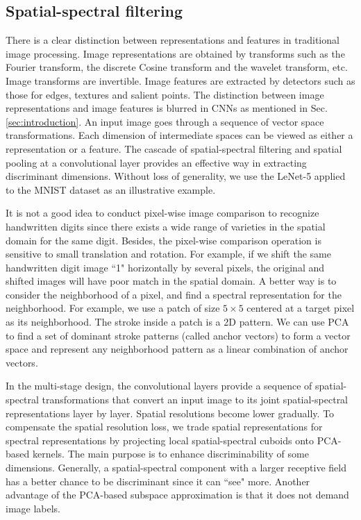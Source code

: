\documentclass[preprint,12pt]{elsarticle}
\begin{document}
\subsection{Spatial-spectral filtering}\label{subsec:filtering}

There is a clear distinction between representations and features in
traditional image processing. Image representations are obtained by
transforms such as the Fourier transform, the discrete Cosine transform
and the wavelet transform, etc. Image transforms are invertible.  Image
features are extracted by detectors such as those for edges, textures
and salient points. The distinction between image representations and
image features is blurred in CNNs as mentioned in Sec.
\ref{sec:introduction}. An input image goes through a sequence of vector
space transformations. Each dimension of intermediate spaces can be
viewed as either a representation or a feature.  The cascade of
spatial-spectral filtering and spatial pooling at a convolutional layer
provides an effective way in extracting discriminant dimensions.
Without loss of generality, we use the LeNet-5 applied to the MNIST
dataset as an illustrative example. 

It is not a good idea to conduct pixel-wise image comparison to
recognize handwritten digits since there exists a wide range of
varieties in the spatial domain for the same digit. Besides, the
pixel-wise comparison operation is sensitive to small translation and
rotation. For example, if we shift the same handwritten digit image ``1"
horizontally by several pixels, the original and shifted images will
have poor match in the spatial domain. A better way is to consider the
neighborhood of a pixel, and find a spectral representation for the
neighborhood.  For example, we use a patch of size $5 \times 5$ centered
at a target pixel as its neighborhood. The stroke inside a patch is a 2D
pattern. We can use PCA to find a set of dominant stroke patterns
(called anchor vectors) to form a vector space and represent any
neighborhood pattern as a linear combination of anchor vectors. 

In the multi-stage design, the convolutional layers provide a sequence
of spatial-spectral transformations that convert an input image to its
joint spatial-spectral representations layer by layer. Spatial
resolutions become lower gradually. To compensate the spatial resolution
loss, we trade spatial representations for spectral representations by
projecting local spatial-spectral cuboids onto PCA-based kernels.  The
main purpose is to enhance discriminability of some dimensions.
Generally, a spatial-spectral component with a larger receptive field
has a better chance to be discriminant since it can ``see" more. Another
advantage of the PCA-based subspace approximation is that it does not
demand image labels. 
\end{document}
